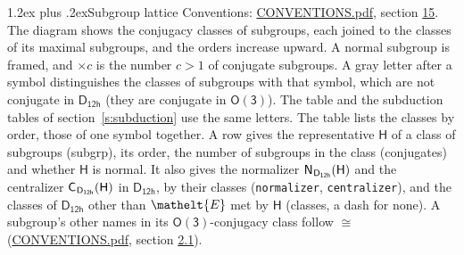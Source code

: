 \documentclass[10pt,a4paper]{article}
\makeatletter
\renewcommand\section{\@startsection{section}{1}{\z@}{-3ex plus -1ex minus -.2ex}%
  {1.2ex plus .2ex}{\normalfont\large\sffamily\bfseries\color{parttitle}}}
\numberwithin{equation}{section}
\newcommand{\eltfont}[1]{{\let\sigma\eltsigma\mathelt{#1}}}
\newcommand{\grp}[1]{\mathsf{#1}}
\newcommand{\cls}[1]{\eltfont{#1}}
\newcommand{\samecls}{\cong}
\newcommand{\hairsp}{\mkern1mu}
\makeatother
\begin{document}
\section{Subgroup lattice}\label{s:subgroups}
Conventions: \href{../../CONVENTIONS.pdf}{CONVENTIONS.pdf}, section \href{../../CONVENTIONS.pdf\#conv.15}{15}.
The diagram shows the conjugacy classes of subgroups, each joined to the classes of its maximal subgroups, and the orders increase upward. A normal subgroup is framed, and ${\times}c$ is the number $c > 1$ of conjugate subgroups. A gray letter after a symbol distinguishes the classes of subgroups with that symbol, which are not conjugate in $\grp{D_{12h}}$ (they are conjugate in \href{O3.pdf}{$\grp{O(3)}$}). The table and the subduction tables of section~\ref{s:subduction} use the same letters. The table lists the classes by order, those of one symbol together. \label{n:group.H}\label{n:head.subgroup}\label{n:head.order}\label{n:head.conjugates}\label{n:head.normal}A row gives the representative $\grp{H}$ of a class of subgroups (subgrp), its order, the number of subgroups in the class (conjugates) and whether $\grp{H}$ is normal. \label{n:group.normalizer}\label{n:group.centralizer}\label{n:head.classes}It also gives the normalizer $\grp{N}_{\hairsp \grp{D_{12h}}}(\grp{H})$ and the centralizer $\grp{C}_{\hairsp \grp{D_{12h}}}(\grp{H})$ in $\grp{D_{12h}}$, by their classes (\texttt{normalizer}, \texttt{centralizer}), and the classes of $\grp{D_{12h}}$ other than $\cls{E}$ met by $\grp{H}$ (classes, a dash for none). A subgroup's other names in its \href{O3.pdf}{$\grp{O(3)}$}-conjugacy class follow $\samecls$ (\href{../../CONVENTIONS.pdf}{CONVENTIONS.pdf}, section \href{../../CONVENTIONS.pdf\#conv.2.1}{2.1}).
\end{document}
